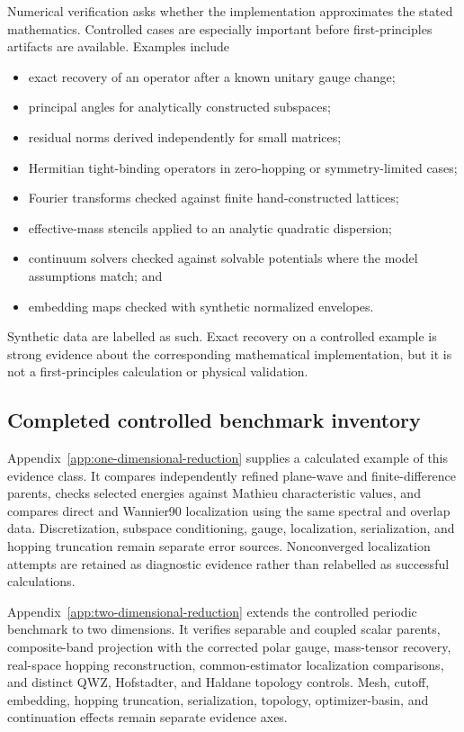 Numerical verification asks whether the implementation approximates the stated
mathematics. Controlled cases are especially important before first-principles
artifacts are available. Examples include

\begin{itemize}
  \item exact recovery of an operator after a known unitary gauge change;
  \item principal angles for analytically constructed subspaces;
  \item residual norms derived independently for small matrices;
  \item Hermitian tight-binding operators in zero-hopping or symmetry-limited
    cases;
  \item Fourier transforms checked against finite hand-constructed lattices;
  \item effective-mass stencils applied to an analytic quadratic dispersion;
  \item continuum solvers checked against solvable potentials where the model
    assumptions match; and
  \item embedding maps checked with synthetic normalized envelopes.
\end{itemize}

Synthetic data are labelled as such. Exact recovery on a controlled example is
strong evidence about the corresponding mathematical implementation, but it is
not a first-principles calculation or physical validation.

\subsection{Completed controlled benchmark inventory}


Appendix~\ref{app:one-dimensional-reduction} supplies a calculated example of
this evidence class. It compares independently refined plane-wave and
finite-difference parents, checks selected energies against Mathieu
characteristic values, and compares direct and Wannier90 localization using the
same spectral and overlap data. Discretization, subspace conditioning, gauge,
localization, serialization, and hopping truncation remain separate error
sources. Nonconverged localization attempts are retained as diagnostic evidence
rather than relabelled as successful calculations.

Appendix~\ref{app:two-dimensional-reduction} extends the controlled
periodic benchmark to two dimensions. It verifies separable and coupled scalar
parents, composite-band projection with the corrected polar gauge, mass-tensor
recovery, real-space hopping reconstruction, common-estimator localization
comparisons, and distinct QWZ, Hofstadter, and Haldane topology controls.
Mesh, cutoff, embedding, hopping truncation, serialization, topology,
optimizer-basin, and continuation effects remain separate evidence axes.

